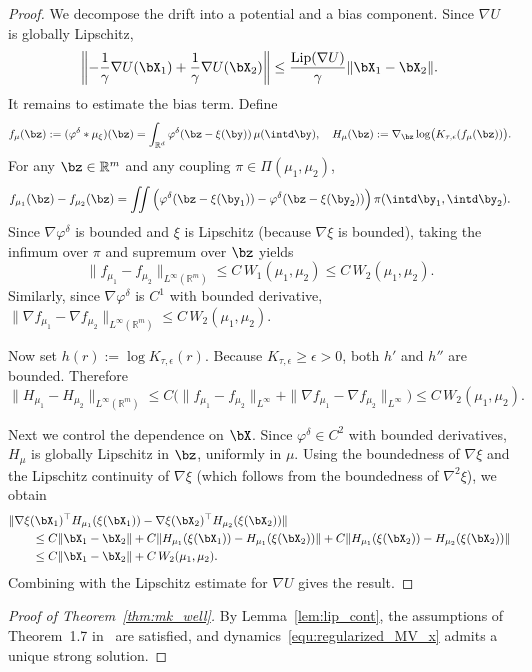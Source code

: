 \documentclass[a4paper,fleqn]{cas-sc}
\theoremstyle{definition}
\begin{document}
\begin{proof}
We decompose the drift into a potential and a bias component. Since $\nabla U$ is globally Lipschitz,
\[
\left\|-\frac1\gamma \nabla U(\bX_1)+\frac1\gamma \nabla U(\bX_2)\right\|
\le
\frac{\mathrm{Lip}(\nabla U)}{\gamma}\|\bX_1-\bX_2\|.
\]
It remains to estimate the bias term. Define
\[
f_\mu(\bz):=(\varphi^\delta * \mu_{\xi})(\bz)
=
\int_{\mathbb R^{d}} \varphi^\delta(\bz-\xi(\by))\,\mu(\intd \by),
\quad
H_\mu(\bz):=\nabla_\bz \log\!\big(K_{\tau,\epsilon}(f_\mu(\bz))\big).
\]
For any $\bz\in\mathbb R^m$ and any coupling $\pi\in\Pi(\mu_1,\mu_2)$,
\[
f_{\mu_1}(\bz)-f_{\mu_2}(\bz)
=
\iint
\Big(
\varphi^\delta(\bz-\xi(\by_1))
-
\varphi^\delta(\bz-\xi(\by_2))
\Big)\,\pi(\intd \by_1,\intd \by_2).
\]
Since $\nabla \varphi^\delta$ is bounded and $\xi$ is Lipschitz (because $\nabla \xi$ is bounded), taking the infimum over $\pi$ and supremum over $\bz$ yields
\[
\|f_{\mu_1}-f_{\mu_2}\|_{L^\infty(\mathbb R^m)}
\le
C\,W_1(\mu_1,\mu_2)
\le
C\,W_2(\mu_1,\mu_2).
\]
Similarly, since $\nabla \varphi^\delta$ is $C^1$ with bounded derivative,
$\|\nabla f_{\mu_1}-\nabla f_{\mu_2}\|_{L^\infty(\mathbb R^m)}
\le
C\,W_2(\mu_1,\mu_2)$.

Now set $h(r):=\log K_{\tau,\epsilon}(r)$.
Because $K_{\tau,\epsilon}\ge \epsilon>0$, both $h'$ and $h''$ are bounded. Therefore
\[
\|H_{\mu_1}-H_{\mu_2}\|_{L^\infty(\mathbb R^m)}
\le
C\Big(
\|f_{\mu_1}-f_{\mu_2}\|_{L^\infty}
+
\|\nabla f_{\mu_1}-\nabla f_{\mu_2}\|_{L^\infty}
\Big)
\le
C\,W_2(\mu_1,\mu_2).
\]

Next we control the dependence on $\bX$. Since $\varphi^\delta\in C^2$ with bounded derivatives, $H_\mu$ is globally Lipschitz in $\bz$, uniformly in $\mu$.
Using the boundedness of $\nabla \xi$ and the Lipschitz continuity of $\nabla \xi$ (which follows from the boundedness of $\nabla^2 \xi$), we obtain
\begin{align*}
&\|\nabla \xi(\bX_1)^\top H_{\mu_1}(\xi(\bX_1))
-
\nabla \xi(\bX_2)^\top H_{\mu_2}(\xi(\bX_2))\| \\
&\qquad \le
C\|\bX_1-\bX_2\|
+
C\|H_{\mu_1}(\xi(\bX_1))-H_{\mu_1}(\xi(\bX_2))\|
+
C\|H_{\mu_1}(\xi(\bX_2))-H_{\mu_2}(\xi(\bX_2))\| \\
&\qquad \le
C\|\bX_1-\bX_2\|+C\,W_2(\mu_1,\mu_2).
\end{align*}
Combining with the Lipschitz estimate for $\nabla U$ gives the result.
\end{proof}

\begin{proof}[Proof of Theorem~\ref{thm:mk_well}]
By Lemma~\ref{lem:lip_cont}, the assumptions of Theorem~1.7 in~\cite{carmona2016lectures} are satisfied, and dynamics~\eqref{equ:regularized_MV_x} admits a unique strong solution.
\end{proof}
\end{document}
